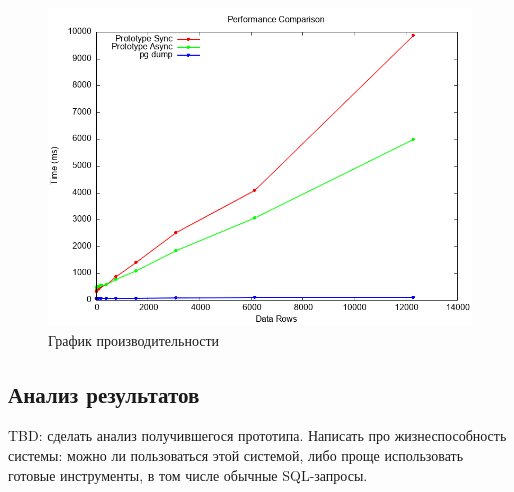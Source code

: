 \begin{figure}
  \includegraphics[scale=0.75]{./img/benchmark.png}
  \caption{График производительности}
  \label{benchmark}
\end{figure}

\subsection{Анализ результатов}

TBD: сделать анализ получившегося прототипа. Написать про жизнеспособность системы: можно ли пользоваться этой системой, либо проще использовать готовые инструменты, в том числе обычные SQL-запросы.
